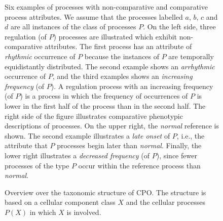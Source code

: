 \documentclass[11pt]{article}
\begin{document}
\begin{figure}[h]
  \centering
  
  \caption{\label{fig:patterns}Six examples of processes with
    non-comparative and comparative process attributes.  We assume
    that the processes labelled $a$, $b$, $c$ and $d$ are all
    instances of the class of processes $P$.  On the left side, three
    regulation (of $P$) processes are illustrated which exhibit
    non-comparative attributes. The first process has an attribute of
    {\em rhythmic} occurrence of $P$ because the instances of $P$ are
    temporally equidistantly distributed. The second example shows an
    {\em arrhythmic} occurrence of $P$, and the third examples shows
    an {\em increasing frequency} (of $P$). A regulation process with
    an increasing frequency (of $P$) is a process in which the
    frequency of occurrences of $P$ is lower in the first half of the
    process than in the second half. The right side of the figure
    illustrates comparative phenotypic descriptions of processes. On
    the upper right, the {\em normal} reference is shown. The second
    example illustrates a {\em late onset} of $P$, i.e., the attribute
    that $P$ processes begin later than {\em normal}. Finally, the
    lower right illustrates a {\em decreased frequency} (of $P$),
    since fewer processes of the type $P$ occur within the reference
    process than {\em normal}.}
\end{figure}

\begin{figure*}[h]
  \centering
  \caption{Overview over the taxonomic structure of CPO. The structure
    is based on a cellular component class $X$ and the cellular
    processes $P(X)$ in which $X$ is involved.\label{fig:overview}}
\end{figure*}

\clearpage
\end{document}
